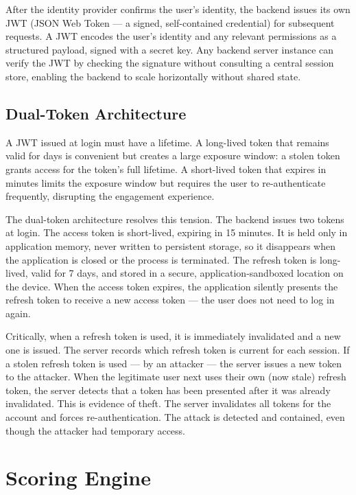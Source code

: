 After the identity provider confirms the user's identity, the backend issues its own JWT (JSON Web Token --- a signed, self-contained credential) for subsequent requests. A JWT encodes the user's identity and any relevant permissions as a structured payload, signed with a secret key. Any backend server instance can verify the JWT by checking the signature without consulting a central session store, enabling the backend to scale horizontally without shared state.

\subsection{Dual-Token Architecture}

A JWT issued at login must have a lifetime. A long-lived token that remains valid for days is convenient but creates a large exposure window: a stolen token grants access for the token's full lifetime. A short-lived token that expires in minutes limits the exposure window but requires the user to re-authenticate frequently, disrupting the engagement experience.

The dual-token architecture resolves this tension. The backend issues two tokens at login. The access token is short-lived, expiring in 15 minutes. It is held only in application memory, never written to persistent storage, so it disappears when the application is closed or the process is terminated. The refresh token is long-lived, valid for 7 days, and stored in a secure, application-sandboxed location on the device. When the access token expires, the application silently presents the refresh token to receive a new access token --- the user does not need to log in again.

Critically, when a refresh token is used, it is immediately invalidated and a new one is issued. The server records which refresh token is current for each session. If a stolen refresh token is used --- by an attacker --- the server issues a new token to the attacker. When the legitimate user next uses their own (now stale) refresh token, the server detects that a token has been presented after it was already invalidated. This is evidence of theft. The server invalidates all tokens for the account and forces re-authentication. The attack is detected and contained, even though the attacker had temporary access.

\section{Scoring Engine}

